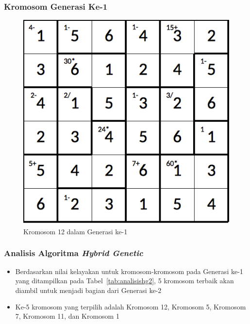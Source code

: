 \documentclass{beamer}
\begin{document}
\note{

}

\begin{frame}
\frametitle{Kromosom Generasi Ke-1}
\begin{figure}
\centering
\captionsetup{justification=centering}
\includegraphics[scale=0.333]{Gambar/hybridgenetic/Generation1Chromosome12}
\caption[Kromosom 12 dalam Generasi ke-1]{Kromosom 12 dalam Generasi ke-1}
\label{fig:analisisg1k12}
\end{figure}
\end{frame}

\note{

}

\begin{frame}
\frametitle{Analisis Algoritma \textit{Hybrid Genetic}}
\begin{itemize}
\item Berdasarkan nilai kelayakan untuk kromosom-kromosom pada Generasi ke-1 yang ditampilkan pada Tabel~\ref{tab:analisishg2}, 5 kromosom terbaik akan diambil untuk menjadi bagian dari Generasi ke-2
\item Ke-5 kromosom yang terpilih adalah Kromosom 12, Kromosom 5, Kromosom 7, Kromosom 11, dan Kromosom 1
\end{itemize}
\end{frame}

\end{document}
